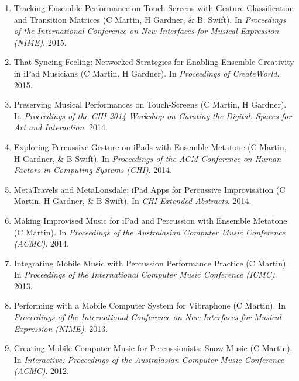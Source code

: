 \documentclass[11pt, a4paper, oneside]{article}
\begin{document}
\begin{enumerate}
\item Tracking Ensemble Performance on Touch-Screens with Gesture
  Classification and Transition Matrices (C Martin, H Gardner, \& B.
  Swift). In \emph{Proceedings of the International Conference on New
    Interfaces for Musical Expression (NIME)}. 2015.
  
\item That Syncing Feeling: Networked Strategies for Enabling
    Ensemble Creativity in iPad Musicians (C Martin, H Gardner). In
  \emph{Proceedings of CreateWorld}. 2015. 

\item Preserving Musical Performances on Touch-Screens (C Martin, H
  Gardner). In \emph{Proceedings of the CHI 2014 Workshop on Curating
    the Digital: Spaces for Art and Interaction}. 2014.

\item Exploring Percussive Gesture on iPads with Ensemble
    Metatone (C Martin, H Gardner, \& B Swift). In
  \emph{Proceedings of the ACM Conference on Human Factors in
    Computing Systems (CHI)}. 2014. 

\item MetaTravels and MetaLonsdale: iPad Apps for Percussive
    Improvisation (C Martin, H Gardner, \& B Swift). In \emph{CHI
    Extended Abstracts}. 2014. 

\item Making Improvised Music for iPad and Percussion with
    Ensemble Metatone (C Martin). In \emph{Proceedings of the Australasian
    Computer Music Conference (ACMC)}. 2014. 

\item Integrating Mobile Music with Percussion Performance
    Practice (C Martin). In \emph{Proceedings of the International
    Computer Music Conference (ICMC)}. 2013.

\item Performing with a Mobile Computer System for Vibraphone (C
  Martin). In \emph{Proceedings of the International Conference on New
    Interfaces for Musical Expression (NIME)}. 2013.

\item Creating Mobile Computer Music for Percussionists: Snow
    Music (C Martin). In \emph{Interactive: Proceedings of the
    Australasian Computer Music Conference (ACMC)}. 2012.


\end{enumerate}
\end{document}
